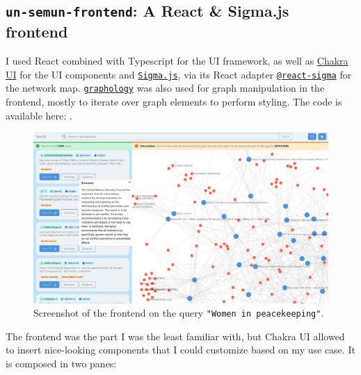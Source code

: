 
\subsection{\texttt{un-semun-frontend}: A React \& Sigma.js frontend} \label{ssec:un-semun-frontend-a-react-sigma-js-frontend}

I used React combined with Typescript for the UI framework, as well as \href{https://chakra-ui.com/}{Chakra UI} for the UI components and \href{https://www.sigmajs.org/}{\texttt{Sigma.js}}, via its React adapter \href{https://sim51.github.io/react-sigma/}{\texttt{@react-sigma}} for the network map. \href{https://graphology.github.io/}{\texttt{graphology}} was also used for graph manipulation in the frontend, mostly to iterate over graph elements to perform styling. The code is available here: .


\begin{figure}[!htb]
    \centering

    \includegraphics[width=\linewidth]{res/un-frontend.png}
    \caption{Screenshot of the frontend on the query \texttt{"Women in peacekeeping"}.}

    \label{fig:frontend-screenshot}
\end{figure}


The frontend was the part I was the least familiar with, but Chakra UI allowed to insert nice-looking components that I could customize based on my use case. It is composed in two panes:

